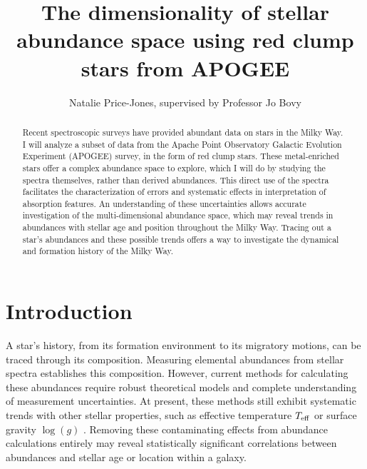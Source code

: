 \documentclass[preprint]{aastex}
\begin{document}
\title{The dimensionality of stellar abundance space using red clump stars from APOGEE}
\author{Natalie Price-Jones, supervised by Professor Jo Bovy}

\begin{abstract}
Recent spectroscopic surveys have provided abundant data on stars in the Milky Way. I will analyze a subset of data from the Apache Point Observatory Galactic Evolution Experiment (APOGEE) survey, in the form of red clump stars. These metal-enriched stars offer a complex abundance space to explore, which I will do by studying the spectra themselves, rather than derived abundances. This direct use of the spectra facilitates the characterization of errors and systematic effects in interpretation of absorption features. An understanding of these uncertainties allows accurate investigation of the multi-dimensional abundance space, which may reveal trends in abundances with stellar age and position throughout the Milky Way. Tracing out a star's abundances and these possible trends offers a way to investigate the dynamical and formation history of the Milky Way.

\end{abstract}

\section{Introduction}
\label{sec:back}
A star's history, from its formation environment to its migratory motions, can be traced through its composition. Measuring elemental abundances from stellar spectra establishes this composition. However, current methods for calculating these abundances require robust theoretical models and complete understanding of measurement uncertainties. At present, these methods still exhibit systematic trends with other stellar properties, such as effective temperature $T_{\rm eff}$ or surface gravity $\log(g)$ \citep{holtzman2015}. Removing these contaminating effects from abundance calculations entirely may reveal statistically significant correlations between abundances and stellar age or location within a galaxy. 
\end{document}
